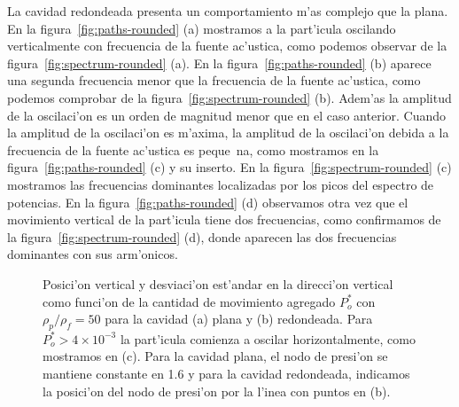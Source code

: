 La cavidad redondeada presenta un comportamiento m'as complejo que la plana. 
En la figura~\ref{fig:paths-rounded} (a) mostramos a la part'icula oscilando verticalmente con 
frecuencia de la fuente ac'ustica, como podemos observar de la figura~\ref{fig:spectrum-rounded} (a).
En la  figura~\ref{fig:paths-rounded} (b) aparece una segunda frecuencia menor que la frecuencia
de la fuente ac'ustica, como podemos comprobar de la figura~\ref{fig:spectrum-rounded} (b).
Adem'as la amplitud de la oscilaci'on es un orden de magnitud menor que en el caso anterior.
Cuando la amplitud de la oscilaci'on es m'axima, la amplitud de la oscilaci'on debida a la
frecuencia de la fuente ac'ustica es peque~na, como mostramos en la figura~\ref{fig:paths-rounded} (c)
y su inserto. En la figura~\ref{fig:spectrum-rounded} (c) mostramos las frecuencias dominantes 
localizadas por  los picos del espectro de potencias. En la figura~\ref{fig:paths-rounded} (d) observamos 
otra vez que  el movimiento vertical de la part'icula tiene dos frecuencias, como confirmamos de la 
figura~\ref{fig:spectrum-rounded} (d), donde aparecen las dos frecuencias dominantes con sus arm'onicos.








\begin{figure} 



\caption{\label{fig:barrido-momento}
Posici'on vertical y desviaci'on est'andar en la direcci'on vertical 
como funci'on de la cantidad de movimiento agregado  $P_o^\ast$ con 
$\rho_p/\rho_f=50$ para la cavidad  (a) plana  y (b) redondeada. Para  
$P_o^\ast>4\times 10^{-3}$ la part'icula comienza a oscilar horizontalmente, como mostramos en (c).
Para la cavidad plana, el nodo de presi'on se mantiene constante en 1.6 y para la cavidad
redondeada, indicamos la posici'on del nodo de presi'on por la l'inea con puntos en (b). 
}
\end{figure}

